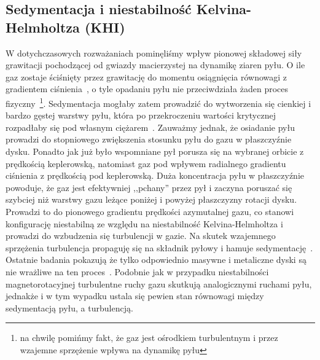 \subsection{Sedymentacja i niestabilność Kelvina-Helmholtza (KHI)}
W dotychczasowych rozważaniach pominęliśmy wpływ pionowej składowej siły
grawitacji pochodzącej od gwiazdy macierzystej na dynamikę ziaren pyłu. O ile
gaz zostaje ściśnięty przez grawitację do momentu osiągnięcia równowagi z
gradientem ciśnienia~, o tyle opadaniu pyłu nie przeciwdziała żaden
proces fizyczny~\footnote{na chwilę pomińmy fakt, że gaz jest ośrodkiem
turbulentnym i przez wzajemne sprzężenie wpływa na dynamikę pyłu}. Sedymentacja
mogłaby zatem prowadzić do wytworzenia się cienkiej i bardzo gęstej warstwy
pyłu, która po przekroczeniu wartości krytycznej rozpadłaby się pod własnym
ciężarem~\citep{GW73}. Zauważmy jednak, że
osiadanie pyłu prowadzi do stopniowego zwiększenia stosunku pyłu do gazu w
płaszczyźnie dysku. Ponadto jak już było wspomniane pył porusza się na wybranej
orbicie z prędkością keplerowską, natomiast gaz pod wpływem radialnego gradientu
ciśnienia z prędkością pod keplerowską. Duża koncentracja pyłu w płaszczyźnie
powoduje, że gaz jest efektywniej ,,pchany'' przez pył i zaczyna poruszać się
szybciej niż warstwy gazu leżące poniżej i powyżej płaszczyzny rotacji dysku.
Prowadzi to do pionowego gradientu prędkości azymutalnej gazu, co stanowi
konfigurację niestabilną ze względu na niestabilność Kelvina-Helmholtza i
prowadzi do wzbudzenia się turbulencji w gazie. Na skutek wzajemnego sprzężenia
turbulencja propaguję się na składnik pyłowy i hamuje sedymentację~\cite{JHK06}.
Ostatnie badania pokazują że tylko odpowiednio masywne i metaliczne dyski są nie
wrażliwe na ten proces~\citep{L10}. Podobnie jak w przypadku niestabilności
magnetorotacyjnej turbulentne ruchy gazu skutkują analogicznymi ruchami pyłu,
jednakże i w tym wypadku ustala się pewien stan równowagi między sedymentacją
pyłu, a turbulencją. 

